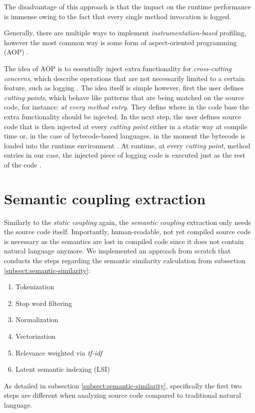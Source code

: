 \documentclass[12pt,a4paper]{report}
\begin{document}
The disadvantage of this approach is that the impact on the runtime performance
is immense owing to the fact that every single method invocation is logged.

Generally, there are multiple ways to implement
\textit{instrumentation\hyp based} profiling, however the most common way
is some form of aspect-oriented programming (AOP) \cite{kiczales1997aop}.

The idea of AOP is to essentially inject extra functionality for
\textit{cross-cutting concerns}, which describe operations that are not
necessarily limited to a certain feature, such as logging \cite{kiczales1997aop}.
The idea itself is simple however, first the user defines \textit{cutting points},
which behave like patterns that are being matched on the source code,
for instance: \textit{at every method entry}.
They define where in the code base the extra functionality should be injected.
In the next step, the user defines source code that is then injected at every
\textit{cutting point} either in a static way at compile time or,
in the case of bytecode\hyp based languages, in the moment the bytecode is loaded
into the runtime environment \cite{kiczales1997aop}.
At runtime, at every \textit{cutting point}, method entries in our case,
the injected piece of logging code is executed just as the rest of the code
\cite{kiczales1997aop}.



\section{Semantic coupling extraction}

Similarly to the \textit{static coupling} again, the \textit{semantic coupling}
extraction only needs the source code itself. Importantly, human-readable,
not yet compiled source code is necessary as the semantics are lost in compiled
code since it does not contain natural language anymore.
We implemented an approach from scratch that conducts the steps regarding the
semantic similarity calculation from subsection \ref{subsect:semantic-similarity}:
\begin{enumerate}[noitemsep]
  \item Tokenization
  \item Stop word filtering
  \item Normalization
  \item Vectorization
  \item Relevance weighted via \textit{tf-idf}
  \item Latent semantic indexing (LSI)
\end{enumerate}
As detailed in subsection \ref{subsect:semantic-similarity},
specifically the first two steps are different when analyzing source code
compared to traditional natural language.
\end{document}
